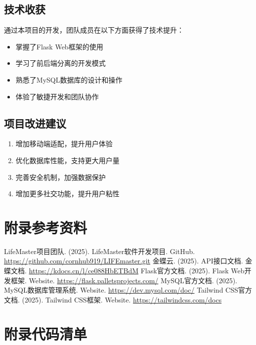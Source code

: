 \documentclass[a4paper]{article}
\begin{document}
\subsection{技术收获}

通过本项目的开发，团队成员在以下方面获得了技术提升：

\begin{itemize}
    \item 掌握了Flask Web框架的使用
    \item 学习了前后端分离的开发模式
    \item 熟悉了MySQL数据库的设计和操作
    \item 体验了敏捷开发和团队协作
\end{itemize}

\subsection{项目改进建议}

\begin{enumerate}
    \item 增加移动端适配，提升用户体验
    \item 优化数据库性能，支持更大用户量
    \item 完善安全机制，加强数据保护
    \item 增加更多社交功能，提升用户粘性
\end{enumerate}

\section{附录参考资料}
\begin{thebibliography}{99}  

    LifeMaster项目团队. (2025). LifeMaster软件开发项目. GitHub. \url{https://github.com/cornhub919/LIFEmaster.git}
    金蝶云. (2025). API接口文档. 金蝶文档. \url{https://kdocs.cn/l/ce088HbETBdM}
    Flask官方文档. (2025). Flask Web开发框架. Website. \url{https://flask.palletsprojects.com/}
    MySQL官方文档. (2025). MySQL数据库管理系统. Website. \url{https://dev.mysql.com/doc/}
    Tailwind CSS官方文档. (2025). Tailwind CSS框架. Website. \url{https://tailwindcss.com/docs}

\end{thebibliography}

\section{附录代码清单}
\end{document}
